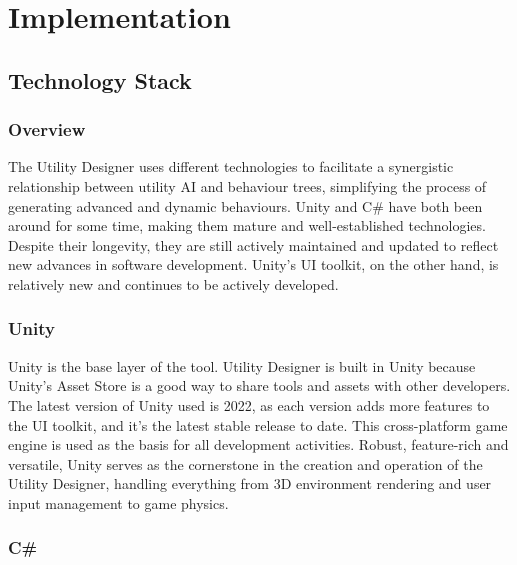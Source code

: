 \section{Implementation}
\label{sec:utilitydesigner_implementation}

\subsection{Technology Stack}
\label{sec:utilitydesigner_implementation_technologystack}

\subsubsection{Overview}
\label{sec:utilitydesigner_implementation_technologystack_overview}

The Utility Designer uses different technologies to facilitate a synergistic relationship between utility AI and behaviour trees, simplifying the process of generating advanced and dynamic behaviours. Unity and C\# have both been around for some time, making them mature and well-established technologies. Despite their longevity, they are still actively maintained and updated to reflect new advances in software development. Unity's UI toolkit, on the other hand, is relatively new and continues to be actively developed.

\subsubsection{Unity}
\label{sec:utilitydesigner_implementation_technologystack_unity}

Unity is the base layer of the tool. Utility Designer is built in Unity because Unity's Asset Store is a good way to share tools and assets with other developers. The latest version of Unity used is 2022, as each version adds more features to the UI toolkit, and it's the latest stable release to date. This cross-platform game engine is used as the basis for all development activities. Robust, feature-rich and versatile, Unity serves as the cornerstone in the creation and operation of the Utility Designer, handling everything from 3D environment rendering and user input management to game physics.

\subsubsection{C\#}
\label{sec:utilitydesigner_implementation_technologystack_csharp}

